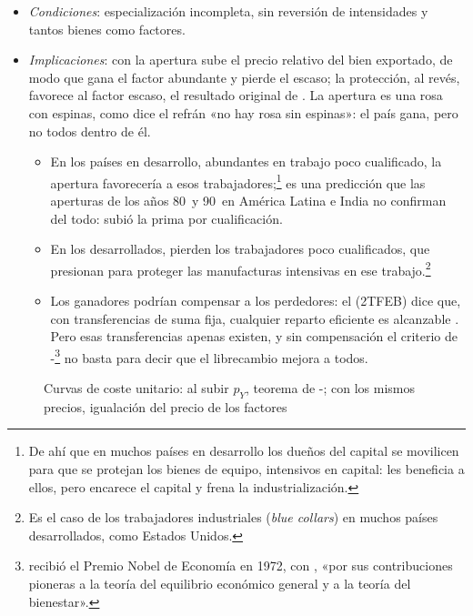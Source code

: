 \documentclass[11pt]{article}
\begin{document}
\begin{itemize}
\item \emph{Condiciones}: especialización incompleta, sin reversión de intensidades y tantos bienes como factores.
\item \emph{Implicaciones}: con la apertura sube el precio relativo del bien exportado, de modo que gana el factor abundante y pierde el escaso; la protección, al revés, favorece al factor escaso, el resultado original de \textcite{StolperSamuelson1941Protection}. La apertura es una rosa con espinas, como dice el refrán «no hay rosa sin espinas»: el país gana, pero no todos dentro de él.
  \begin{itemize}
  \item En los países en desarrollo, abundantes en trabajo poco cualificado, la apertura favorecería a esos trabajadores;\footnote{De ahí que en muchos países en desarrollo los dueños del capital se movilicen para que se protejan los bienes de equipo, intensivos en capital: les beneficia a ellos, pero encarece el capital y frena la industrialización.} es una predicción que las aperturas de los años 80~y 90~en América Latina e India no confirman del todo: subió la prima por cualificación\nocite{GoldbergPavcnik2007Distributional}.
  \item En los desarrollados, pierden los trabajadores poco cualificados, que presionan para proteger las manufacturas intensivas en ese trabajo.\footnote{Es el caso de los trabajadores industriales (\emph{blue collars}) en muchos países desarrollados, como Estados Unidos.}
  \item Los ganadores podrían compensar a los perdedores: el  (2TFEB) dice que, con transferencias de suma fija, cualquier reparto eficiente es alcanzable . Pero esas transferencias apenas existen, y sin compensación el criterio de -\footnote{ recibió el Premio Nobel de Economía en 1972, con , «por sus contribuciones pioneras a la teoría del equilibrio económico general y a la teoría del bienestar»\nocite{Nobel1972HicksArrow}.} no basta para decir que el librecambio mejora a todos.
  \end{itemize}
\end{itemize}
\begin{figure}[H]
\centering
\caption{Curvas de coste unitario: al subir $p_Y$, teorema de -; con los mismos precios, igualación del precio de los factores}\label{fig:costes-unitarios}
\end{figure}
\end{document}
